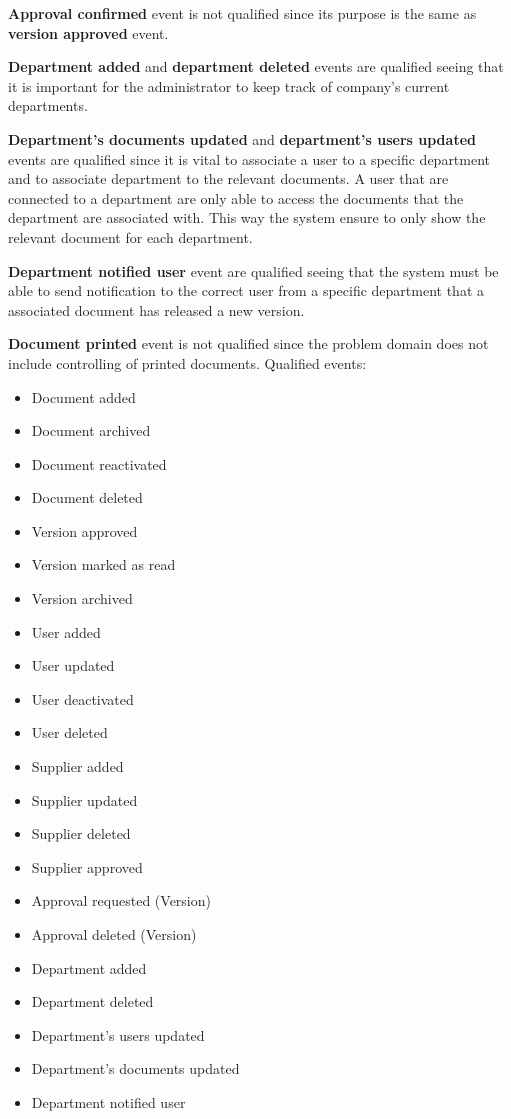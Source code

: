 \textbf{Approval confirmed} event is not qualified since its purpose is the same as \textbf{version approved} event.

\textbf{Department added} and \textbf{department deleted} events are qualified seeing that it is important for the administrator to keep track of company's current departments.

\textbf{Department's documents updated} and \textbf{department's users updated} events are qualified since it is vital to associate a user to a specific department and to associate department to the relevant documents. A user that are connected to a department are only able to access the documents that the department are associated with. This way the system ensure to only show the relevant document for each department. 

\textbf{Department notified user} event are qualified seeing that the system must be able to send notification to the correct user from a specific department that a associated document has released a new version. 

\textbf{Document printed} event is not qualified since the problem domain does not include controlling of printed documents.
\newpage
Qualified events:
\begin{multicols}{2}
	\begin{itemize} 
	\item Document added
	\item Document archived
	\item Document reactivated
	\item Document deleted
	\item Version approved
	\item Version marked as read
	\item Version archived
	\item User added
	\item User updated
	\item User deactivated
	\item User deleted
	\item Supplier added
	\item Supplier updated
	\item Supplier deleted
	\item Supplier approved
	\item Approval requested (Version)
	\item Approval deleted (Version)
	\item Department added
	\item Department deleted
	\item Department's users updated
	\item Department's documents updated
	\item Department notified user
	\end{itemize}
\end{multicols}


